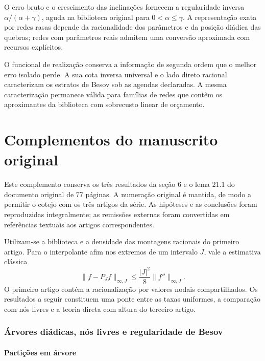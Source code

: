 \documentclass[12pt,a4paper]{article}
\theoremstyle{preciso}
\theoremstyle{definition}
\theoremstyle{preciso}
\theoremstyle{preciso}
\theoremstyle{preciso}
\theoremstyle{preciso}
\theoremstyle{definition}
\theoremstyle{preciso}
\theoremstyle{definition}
\theoremstyle{preciso}
\theoremstyle{preciso}
\theoremstyle{definition}
\renewcommand{\thesection}{\Roman{part}.\arabic{section}}
\newcommand{\volumeparte}[1]{\clearpage\part{#1}\setcounter{section}{0}\setcounter{figure}{0}\setcounter{table}{0}\setcounter{equation}{0}\setcounter{absc}{0}\renewcommand{\thesection}{\Roman{part}.\arabic{section}}}
\newcounter{absc}
\begin{document}
O erro bruto e o crescimento das inclinações fornecem a regularidade inversa $\alpha/(\alpha+\gamma)$, aguda na biblioteca original para $0<\alpha\le\gamma$. A representação exata por redes rasas depende da racionalidade dos parâmetros e da posição diádica das quebras; redes com parâmetros reais admitem uma conversão aproximada com recursos explícitos.

O funcional de realização conserva a informação de segunda ordem que o melhor erro isolado perde. A sua cota inversa universal e o lado direto racional caracterizam os estratos de Besov sob as agendas declaradas. A mesma caracterização permanece válida para famílias de redes que contêm os aproximantes da biblioteca com sobrecusto linear de orçamento.


\volumeparte{Complementos do manuscrito original}


Este complemento conserva os três resultados da seção 6 e o lema 21.1 do documento original de 77 páginas. A numeração original é mantida, de modo a permitir o cotejo com os três artigos da série. As hipóteses e as conclusões foram reproduzidas integralmente; as remissões externas foram convertidas em referências textuais aos artigos correspondentes.

Utilizam-se a biblioteca e a densidade das montagens racionais do primeiro artigo. Para o interpolante afim nos extremos de um intervalo $J$, vale a estimativa clássica
\begin{equation}
\|f-P_Jf\|_{\infty,J}\le\frac{|J|^2}{8}\|f''\|_{\infty,J}.
\label{complemento_original:eq:interpolation-remainder}
\end{equation}
O primeiro artigo contém a racionalização por valores nodais compartilhados. Os resultados a seguir constituem uma ponte entre as taxas uniformes, a comparação com nós livres e a teoria direta com altura do terceiro artigo.
\setcounter{section}{5}
\section{Árvores diádicas, nós livres e regularidade de Besov}
\label{complemento_original:sec:dyadic-trees}

\subsection{Partições em árvore}
\end{document}
